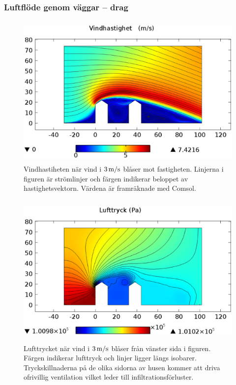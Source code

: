 \subsubsection{Luftflöde genom väggar – drag}

\begin{figure}[hpbt]
\centering
\includegraphics[width=127mm,height=76mm]{images/wind3mshdpi.eps}
\caption{Vindhastiheten när vind i $\unit[3]{ m/s}$ blåser mot fastigheten. Linjerna
i figuren är strömlinjer och färgen indikerar beloppet av hastighetsvektorn. Värdena är framräknade med Comsol.}
\end{figure}

\begin{figure}[hpbt]
\centering
\includegraphics[width=127mm,height=76mm]{images/pressure3mshdpi.eps}
\caption{Lufttrycket när vind i $\unit[3]{ m/s}$ blåser från vänster
sida i figuren. Färgen indikerar lufttryck och linjer ligger längs isobarer.
Tryckskillnaderna på de olika sidorna av husen kommer att driva ofrivillig ventilation vilket leder till infiltrationsförluster.}
\end{figure}


